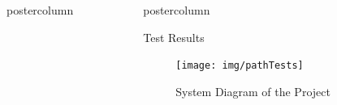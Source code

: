 \documentclass{beamer}
\newlength{\columnheight}
\begin{document}
\begin{frame}
\begin{columns}
\begin{column}{.5\textwidth}
\begin{beamercolorbox}[center]{postercolumn}
\begin{minipage}{.98\textwidth}
{		}\end{minipage}\end{beamercolorbox}
	\end{column}
	\begin{column}{.5\textwidth}
		\begin{beamercolorbox}[center]{postercolumn}
			\begin{minipage}{.98\textwidth} %
				\parbox[t][\columnheight]{\textwidth}{ %
					\begin{myblock}{Test Results}
			
				\begin{figure}
					\centering
					\texttt{[image: img/pathTests]}
					\caption{System Diagram of the Project}
					\label{fig:overall-system}
				\end{figure}
	

\end{myblock}}
\end{minipage}
\end{beamercolorbox}
\end{column}
\end{columns}
\end{frame}
\end{document}
